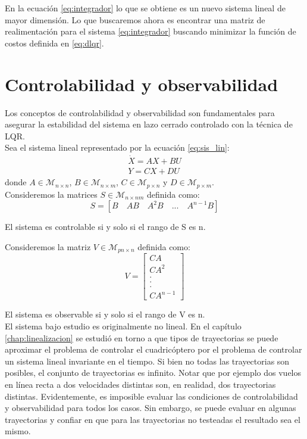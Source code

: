 \documentclass[main]{subfiles}
\begin{document}
En la ecuaci\'on \ref{eq:integrador} lo que se obtiene es un nuevo sistema lineal de mayor dimensi\'on. Lo que buscaremos ahora es encontrar una matriz de realimentaci\'on para el sistema \ref{eq:integrador} buscando minimizar la funci\'on de costos definida en \ref{eq:dlqr}.

\section{Controlabilidad y observabilidad}

Los conceptos de controlabilidad y observabilidad son fundamentales para asegurar la estabilidad del sistema en lazo cerrado controlado con la t\'ecnica de LQR.\\

Sea el sistema lineal representado por la ecuaci\'on \ref{eq:sis_lin}:
\begin{equation}
\label{eq:sis_lin}
\begin{array}{c}
\dot{X} = AX+BU \\
Y = CX+DU
\end{array}
\end{equation}
donde $A \in \mathcal{M}_{n \times n}$, $B \in \mathcal{M}_{n \times m}$, $C \in \mathcal{M}_{p \times n}$ y $D \in \mathcal{M}_{p \times m}$.\\

Consideremos la matrices $S\in \mathcal{M}_{n \times nm}$  definida como:
\begin{equation}
\label{eq:contr}
S = [B \quad AB \quad A^2B \quad ...\quad A^{n-1}B]
\end{equation}

El sistema es controlable si y solo si el rango de S es n. 

Consideremos la matriz $V\in \mathcal{M}_{pn \times n}$ definida como:
\begin{equation}
\label{eq:obs}
V=
\left[
\begin{array}{c}
 CA\\
CA^2\\
.\\
.\\
.\\
CA^{n-1}
\end{array}\right]
\end{equation}

El sistema es observable si y solo si el rango de V es n.\\

El sistema bajo estudio es originalmente no lineal. En el cap\'itulo \ref{chap:linealizacion} se estudi\'o en torno a que tipos de trayectorias se puede aproximar el problema de controlar el cuadric\'optero por el problema de controlar un sistema lineal invariante en el tiempo. Si bien no todas las trayectorias son posibles, el conjunto de trayectorias es infinito. Notar que por ejemplo dos vuelos en l\'inea recta a dos velocidades distintas son, en realidad, dos trayectorias distintas. Evidentemente, es imposible evaluar las condiciones de controlabilidad y observabilidad para todos los casos. Sin embargo, se puede evaluar en algunas trayectorias y confiar en que para las trayectorias no testeadas el resultado sea el mismo.\\
\end{document}
